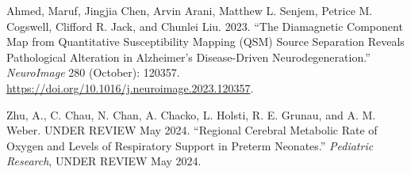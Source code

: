 \documentclass[
sn-nature
]{sn-jnl}
\newlength{\cslhangindent}
\newenvironment{CSLReferences}[2] %
 {\begin{list}{}{%
  \setlength{\itemindent}{0pt}
  \setlength{\leftmargin}{0pt}
  \setlength{\parsep}{0pt}
  \ifodd #1
   \setlength{\leftmargin}{\cslhangindent}
   \setlength{\itemindent}{-1\cslhangindent}
  \fi
  \setlength{\itemsep}{#2\baselineskip}}}
 {\end{list}}
\begin{document}
\label{refs}
\begin{CSLReferences}{1}{0}
Ahmed, Maruf, Jingjia Chen, Arvin Arani, Matthew L. Senjem, Petrice M.
Cogswell, Clifford R. Jack, and Chunlei Liu. 2023. {``The Diamagnetic
Component Map from Quantitative Susceptibility Mapping ({QSM}) Source
Separation Reveals Pathological Alteration in {Alzheimer}'s
Disease-Driven Neurodegeneration.''} \emph{NeuroImage} 280 (October):
120357. \url{https://doi.org/10.1016/j.neuroimage.2023.120357}.

Zhu, A., C. Chau, N. Chan, A. Chacko, L. Holsti, R. E. Grunau, and A. M.
Weber. UNDER REVIEW May 2024. {``Regional Cerebral Metabolic Rate of
Oxygen and Levels of Respiratory Support in Preterm Neonates.''}
\emph{Pediatric Research}, UNDER REVIEW May 2024.

\end{CSLReferences}
\end{document}

